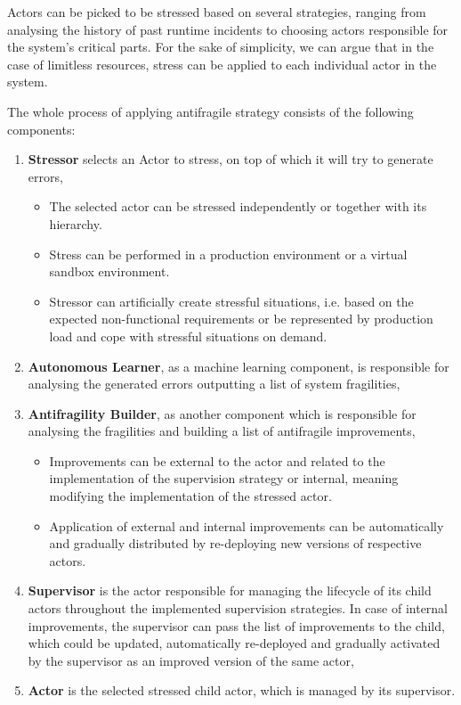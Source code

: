 \documentclass[conference]{IEEEtran}
\begin{document}
Actors can be picked to be stressed based on several strategies, ranging from analysing the history of past runtime incidents to choosing actors responsible for the system's critical parts. For the sake of simplicity, we can argue that in the case of limitless resources, stress can be applied to each individual actor in the system.

The whole process of applying antifragile strategy consists of the following components:

\begin{enumerate}
    \item \textbf{Stressor} selects an Actor to stress, on top of which it will try to generate errors,

    \begin{itemize}
        \item The selected actor can be stressed independently or together with its hierarchy.
        \item Stress can be performed in a production environment or a virtual sandbox environment.
        \item Stressor can artificially create stressful situations, i.e. based on the expected non-functional requirements or be represented by production load and cope with stressful situations on demand.
    \end{itemize}

    \item \textbf{Autonomous Learner}, as a machine learning component, is responsible for analysing the generated errors outputting a list of system fragilities,

    \item \textbf{Antifragility Builder}, as another component which is responsible for analysing the fragilities and building a list of antifragile improvements,

    \begin{itemize}
        \item Improvements can be external to the actor and related to the implementation of the supervision strategy or internal, meaning modifying the implementation of the stressed actor.
        \item Application of external and internal improvements can be automatically and gradually distributed by re-deploying new versions of respective actors.
    \end{itemize}

    \item \textbf{Supervisor} is the actor responsible for managing the lifecycle of its child actors throughout the implemented supervision strategies. In case of internal improvements, the supervisor can pass the list of improvements to the child, which could be updated, automatically re-deployed and gradually activated by the supervisor as an improved version of the same actor,

    \item \textbf{Actor} is the selected stressed child actor, which is managed by its supervisor.

\end{enumerate}
\end{document}
